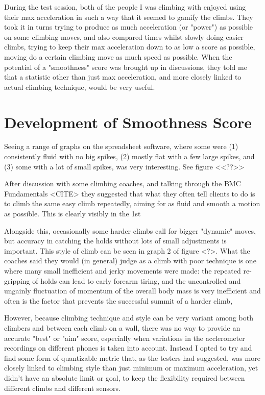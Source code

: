 During the test session, both of the people I was climbing with enjoyed using their max acceleration in such a way that it seemed to gamify the climbs.
They took it in turns trying to produce as much acceleration (or "power") as possible on some climbing moves, and also compared times whilst slowly doing easier climbs, trying to keep their max acceleration down to as low a score as possible, moving do a certain climbing move as much speed as possible.
When the potential of a "smoothness" score was brought up in discussions, they told me that a statistic other than just max acceleration, and more closely linked to actual climbing technique, would be very useful.


\section{Development of Smoothness Score}
Seeing a range of graphs on the spreadsheet software, where some were (1) consistently fluid with no big spikes, (2) mostly flat with a few large spikes,  and (3) some with a lot of small spikes, was very interesting. 
See figure <<??>>


After discussion with some climbing coaches, and talking through the BMC Fundamentals <CITE> they suggested that what they often tell clients to do is to climb the same easy climb repeatedly, aiming for as fluid and smooth a motion as possible.
This is clearly visibly in the 1st


Alongside this, occasionally some harder climbs call for bigger "dynamic" moves, but accuracy in catching the holds without lots of small adjustments is important.
This style of climb can be seen in graph 2 of figure <?>.
What the coaches said they would (in general) judge as a climb with poor technique is one where many small inefficient and jerky movements were made: the repeated re-gripping of holds can lead to early forearm tiring, and the uncontrolled and ungainly fluctuation of momentum of the overall body mass is very inefficient and often is the factor that prevents the successful summit of a harder climb,   

However, because climbing technique and style can be very variant among both climbers and between each climb on a wall, there was no way to provide an accurate "best" or "aim" score, especially when variations in the acclerometer recordings on different phones is taken into account.
Instead I opted to try and find some form of quantizable metric that, as the testers had suggested, was more closely linked to climbing style than just minimum or maximum acceleration, yet didn't have an absolute limit or goal, to keep the flexibility required between different climbs and different sensors.

